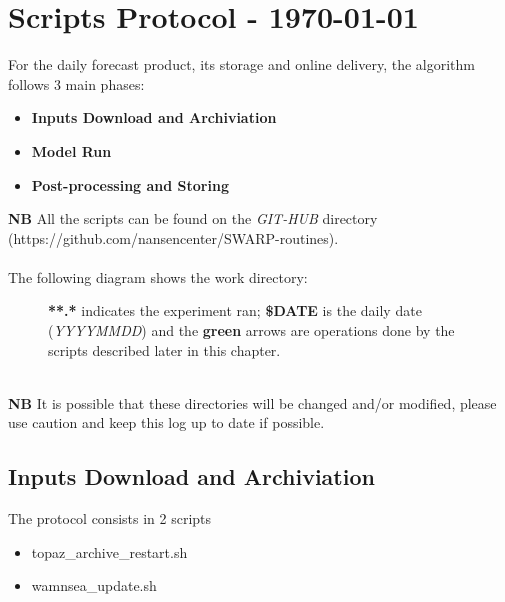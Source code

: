 \documentclass[12pt,a4paper]{report}
\begin{document}
\chapter{Scripts Protocol - \today}
For the daily forecast product, its storage and online delivery, the algorithm follows 3 main phases:
\begin{itemize}
\item \textbf{Inputs Download and Archiviation}
\item \textbf{Model Run}
\item \textbf{Post-processing and Storing}
\end{itemize}
\textbf{NB} All the scripts can be found on the \textit{GIT-HUB} directory (https://github.com/nansencenter/SWARP-routines). 
\\ \\
The following diagram shows the work directory:
\begin{figure}[h!]
\centering
{}
\caption{\textbf{**.*} indicates the experiment ran; \textbf{\$DATE} is the daily date (\textit{YYYYMMDD}) and the \textbf{green} arrows are operations done by the scripts described later in this chapter. }
\label{wrkdir}
\end{figure}
\\
\textbf{NB} It is possible that these directories will be changed and/or modified, please use caution and keep this log up to date if possible.

\section{Inputs Download and Archiviation}
\label{IDA}
The protocol consists in 2 scripts
\begin{itemize}
\item topaz\_archive\_restart.sh
\item wamnsea\_update.sh
\end{itemize}
\end{document}
